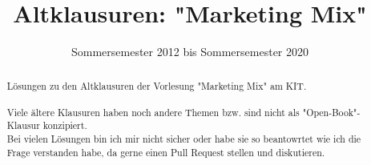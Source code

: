 \documentclass[]{article}
\title{Altklausuren: "Marketing Mix"}
\date{Sommersemester 2012 bis Sommersemester 2020}
\begin{document}
\maketitle

\begin{abstract}
Lösungen zu den Altklausuren der Vorlesung "Marketing Mix" am KIT. \\
\ \\
Viele ältere Klausuren haben noch andere Themen bzw. sind nicht als "Open-Book"-Klausur konzipiert. \\
Bei vielen Lösungen bin ich mir nicht sicher oder habe sie so beantowrtet wie ich die Frage verstanden habe, da gerne einen Pull Request stellen und diskutieren. \\
\end{abstract}
\newpage




\end{document}
